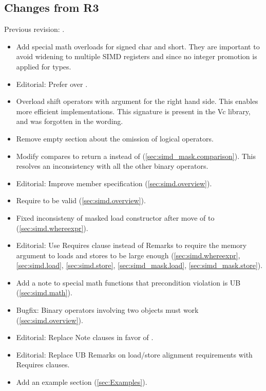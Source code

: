 \subsection{Changes from R3}
Previous revision: \parencite{P0214R3}.
\begin{itemize}
  \item Add special math overloads for signed char and short.
        They are important to avoid widening to multiple SIMD registers and since no integer promotion is applied for \simd types.
  \item Editorial: Prefer  over .
  \item Overload shift operators with \intt argument for the right hand side.
        This enables more efficient implementations.
        This signature is present in the Vc library, and was forgotten in the wording.
  \item Remove empty section about the omission of logical operators.
  \item Modify \mask compares to return a \mask instead of \bool (\ref{sec:simd_mask.comparison}).
        This resolves an inconsistency with all the other binary operators.
  \item Editorial: Improve  member specification (\ref{sec:simd.overview}).
  \item Require  to be valid (\ref{sec:simd.overview}).
  \item Fixed inconsisteny of masked load constructor after move of  to  (\ref{sec:simd.whereexpr}).
  \item Editorial: Use Requires clause instead of Remarks to require the memory argument to loads and stores to be large enough (\ref{sec:simd.whereexpr}, \ref{sec:simd.load}, \ref{sec:simd.store}, \ref{sec:simd_mask.load}, \ref{sec:simd_mask.store}).
  \item Add a note to special math functions that precondition violation is UB (\ref{sec:simd.math}).
  \item Bugfix: Binary operators involving two  objects must work (\ref{sec:simd.overview}).
  \item Editorial: Replace Note clauses in favor of \wgNote{}.
  \item Editorial: Replace UB Remarks on load/store alignment requirements with Requires clauses.
  \item Add an example section (\ref{sec:Examples}).

\end{itemize}
